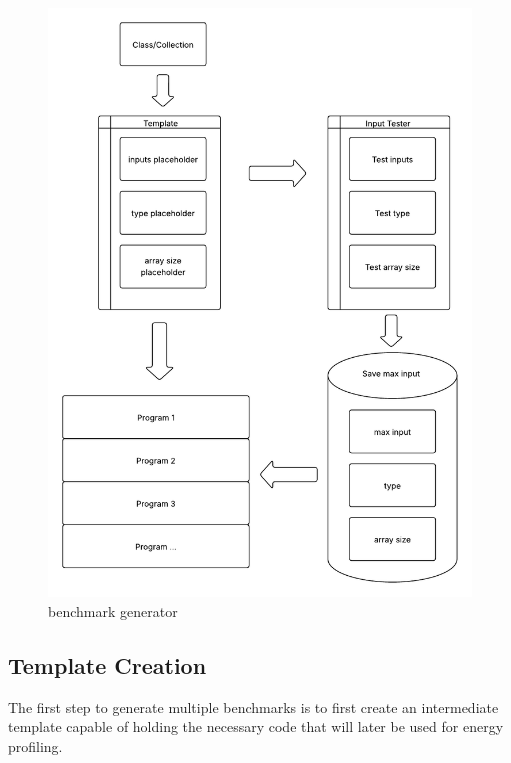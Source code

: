 \begin{figure}[htbp]%
    \centering
    \includegraphics[width = 1 \textwidth]{figures/program_generator.pdf}
    \caption{benchmark generator}
    \label{fig:program_generator}
\end{figure}


\subsection{Template Creation} \label{sec:work_stage1_template_creation}

The first step to generate multiple benchmarks is to first create an intermediate template capable of holding the necessary code that will later be used for energy profiling.

